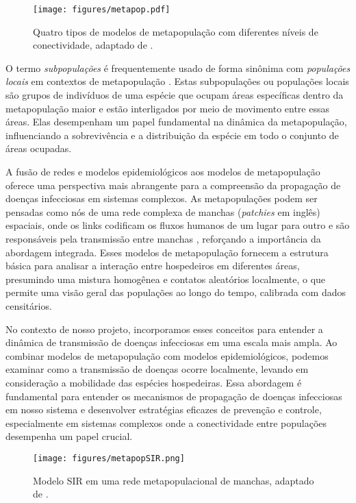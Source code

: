 \begin{figure}[!h]
    \centering
    \texttt{[image: figures/metapop.pdf]}
    \caption{Quatro tipos de modelos de metapopulação \cite{Harrison2008} com diferentes níveis de conectividade, adaptado de .}
    \label{fig:metapopulations}
\end{figure}

\newpage

O termo \textit{subpopulações} é frequentemente usado de forma sinônima com \textit{populações locais} em contextos de metapopulação \cite{HanskiGaggiotti2004}. Estas subpopulações ou populações locais são grupos de indivíduos de uma espécie que ocupam áreas específicas dentro da metapopulação maior e estão interligados por meio de movimento entre essas áreas. Elas desempenham um papel fundamental na dinâmica da metapopulação, influenciando a sobrevivência e a distribuição da espécie em todo o conjunto de áreas ocupadas.

A fusão de redes e modelos epidemiológicos aos modelos de metapopulação oferece uma perspectiva mais abrangente para a compreensão da propagação de doenças infecciosas em sistemas complexos. As metapopulações podem ser pensadas como nós de uma rede complexa de manchas (\textit{patchies} em inglês) espaciais, onde os links codificam os fluxos humanos de um lugar para outro e são responsáveis pela transmissão entre manchas \cite{HAGENAARS2004349}, reforçando a importância da abordagem integrada. Esses modelos de metapopulação fornecem a estrutura básica para analisar a interação entre hospedeiros em diferentes áreas, presumindo uma mistura homogênea e contatos aleatórios localmente, o que permite uma visão geral das populações ao longo do tempo, calibrada com dados censitários.

No contexto de nosso projeto, incorporamos esses conceitos para entender a dinâmica de transmissão de doenças infecciosas em uma escala mais ampla. Ao combinar modelos de metapopulação com modelos epidemiológicos, podemos examinar como a transmissão de doenças ocorre localmente, levando em consideração a mobilidade das espécies hospedeiras. Essa abordagem é fundamental para entender os mecanismos de propagação de doenças infecciosas em nosso sistema e desenvolver estratégias eficazes de prevenção e controle, especialmente em sistemas complexos onde a conectividade entre populações desempenha um papel crucial.

\begin{figure}[!h]
    \centering
    \texttt{[image: figures/metapopSIR.png]}
    \caption{Modelo SIR em uma rede metapopulacional de manchas, adaptado de .}
    \label{fig:metapopulations}
\end{figure}

